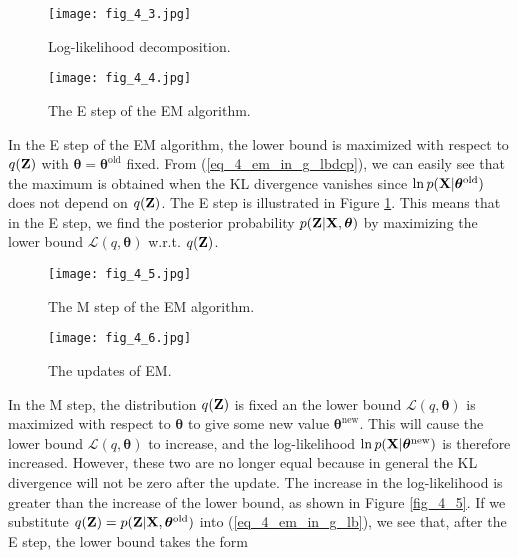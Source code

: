 \documentclass[../book-template.tex]{subfiles}
\begin{document}
\begin{figure}[h]
	\centering
	\begin{minipage}[t]{0.42\linewidth}
		\centering
		\texttt{[image: fig\_4\_3.jpg]}
		\caption{Log-likelihood decomposition.}\label{fig_4_3}
	\end{minipage}
	\begin{minipage}[t]{0.48\linewidth}       
		\centering
		\texttt{[image: fig\_4\_4.jpg]}
		\caption{The E step of the EM algorithm.}\label{fig_4_4}
	\end{minipage}
\end{figure}
\par In the E step of the EM algorithm, the lower bound is maximized with respect to $q({\bf Z})$ with $\bm{\theta}=\bm{\theta}^{\text{old}}$ fixed. From (\ref{eq_4_em_in_g_lbdcp}), we can easily see that the maximum is obtained when the KL divergence vanishes since $\ln p({\bf X}|\bm{\theta}^{\text{old}})$ does not depend on $q({\bf Z})$. The E step is illustrated in Figure \ref{fig_4_4}. This means that in the E step, we find the posterior probability $p({\bf Z}|{\bf X},\bm{\theta})$ by maximizing the lower bound $\mathcal{L}(q,\bm{\theta})$ w.r.t. $q({\bf Z})$.
\begin{figure}[h]
	\centering
	\begin{minipage}[t]{0.42\linewidth}
		\centering
		\texttt{[image: fig\_4\_5.jpg]}
		\caption{The M step of the EM algorithm.}\label{fig_4_5}
	\end{minipage}
	\begin{minipage}[t]{0.48\linewidth}       
		\centering
		\texttt{[image: fig\_4\_6.jpg]}
		\caption{The updates of EM.}\label{fig_4_6}
	\end{minipage}
\end{figure}
\par In the M step, the distribution $q({\bf Z})$ is fixed an the lower bound $\mathcal{L}(q,\bm{\theta})$ is maximized with respect to $\bm{\theta}$ to give some new value $\bm{\theta}^{\text{new}}$. This will cause the lower bound $\mathcal{L}(q,\bm{\theta})$ to increase, and the log-likelihood $\ln p({\bf X}|\bm{\theta}^{\text{new}})$ is therefore increased. However, these two are no longer equal because in general the KL divergence will not be zero after the update. The increase in the log-likelihood is greater than the increase of the lower bound, as shown in Figure \ref{fig_4_5}. If we substitute $q({\bf Z})=p({\bf Z}|{\bf X}, \bm{\theta}^{\text{old}})$ into (\ref{eq_4_em_in_g_lb}), we see that, after the E step, the lower bound takes the form
\end{document}
